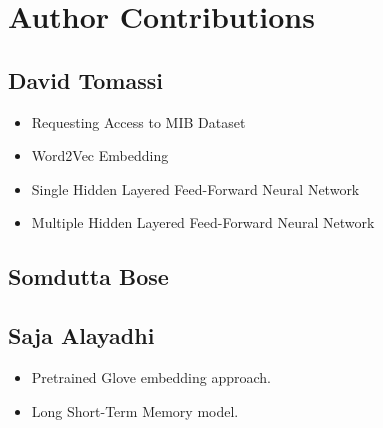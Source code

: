 \section{Author Contributions}
\label{sec:author-contributions}

\subsection{David Tomassi}
\begin{itemize}
    \item Requesting Access to MIB Dataset
    \item Word2Vec Embedding
    \item Single Hidden Layered Feed-Forward Neural Network
    \item Multiple Hidden Layered Feed-Forward Neural Network
\end{itemize}

\subsection{Somdutta Bose}

\subsection{Saja Alayadhi}
\begin{itemize}
    \item Pretrained Glove embedding approach.
    \item Long Short-Term Memory model.
\end{itemize}